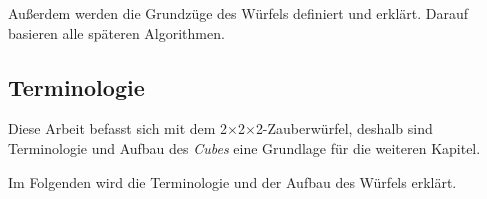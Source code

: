 \documentclass[12pt,a4paper, usenames, dvipsnames]{article}
\newcommand{\Ttwo}{2$\times$2$\times$2-}
\begin{document}
Außerdem werden die Grundzüge des Würfels definiert und erklärt. Darauf basieren alle späteren Algorithmen. 


%
%
%
%
%
%
%
%
%
%
\subsection*{Terminologie} 

Diese Arbeit befasst sich mit dem \Ttwo Zauberwürfel, deshalb sind Terminologie und Aufbau des \textit{Cubes} eine Grundlage für die weiteren Kapitel.
 
Im Folgenden wird die Terminologie und der Aufbau des Würfels erklärt.
\end{document}
